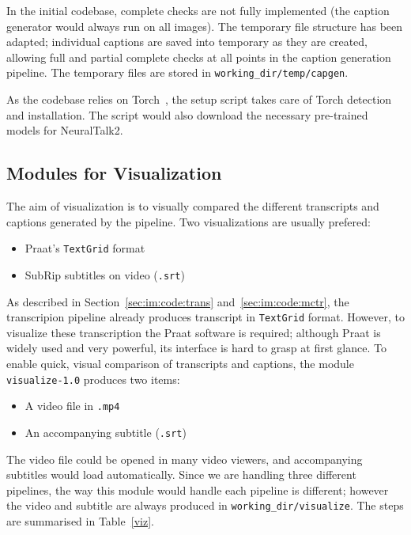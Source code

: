 In the initial codebase, complete checks are not fully implemented (the
caption generator would always run on all images). The temporary file
structure has been adapted; individual captions are saved into temporary as
they are created, allowing full and partial complete checks at all points
in the caption generation pipeline. The temporary files are stored in
\texttt{working\_dir/temp/capgen}.

As the codebase relies on Torch~\cite{th}, the setup script takes care
of Torch detection and installation. The script would also download the
necessary pre-trained models for NeuralTalk2.

\subsection{Modules for Visualization}\label{sec:im:code:viz}

The aim of visualization is to visually compared the different transcripts
and captions generated by the pipeline. Two visualizations are usually
prefered:

\begin{itemize}
    \item Praat's \texttt{TextGrid} format
    \item SubRip subtitles on video (\texttt{.srt})~\cite{srt}
\end{itemize}

As described in Section~\ref{sec:im:code:trans} and~\ref{sec:im:code:mctr},
the transcripion pipeline already produces transcript in \texttt{TextGrid}
format. However, to visualize these transcription the Praat software is
required; although Praat is widely used and very powerful, its interface is
hard to grasp at first glance. To enable quick, visual comparison of transcripts
and captions, the module \texttt{visualize-1.0} produces two items:

\begin{itemize}
    \item A video file in \texttt{.mp4}
    \item An accompanying subtitle (\texttt{.srt})
\end{itemize}

The video file could be opened in many video viewers, and accompanying subtitles
would load automatically. Since we are handling three different pipelines,
the way this module would handle each pipeline is different; however the
video and subtitle are always produced in \texttt{working\_dir/visualize}.
The steps are summarised in Table~\ref{viz}.

